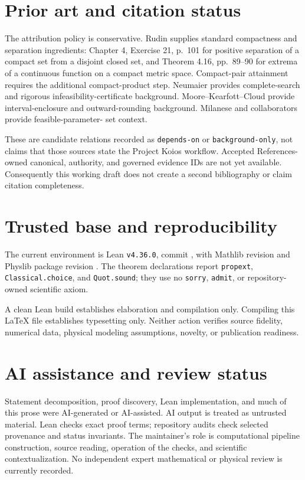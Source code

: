 \documentclass[11pt]{article}
\begin{document}
\section{Prior art and citation status}

The attribution policy is conservative. Rudin supplies standard compactness and
separation ingredients: Chapter 4, Exercise 21, p.~101 for positive separation of a
compact set from a disjoint closed set, and Theorem 4.16, pp.~89--90 for extrema of a
continuous function on a compact metric space. Compact-pair attainment requires the
additional compact-product step. Neumaier provides complete-search and rigorous
infeasibility-certificate background. Moore--Kearfott--Cloud provide interval-enclosure
and outward-rounding background. Milanese and collaborators provide feasible-parameter-
set context.

These are candidate relations recorded as \texttt{depends-on} or
\texttt{background-only}, not claims that those sources state the Project Koios workflow.
Accepted References-owned canonical, authority, and governed evidence IDs are not yet
available. Consequently this working draft does not create a second bibliography or
claim citation completeness.

\section{Trusted base and reproducibility}

The current environment is Lean \texttt{v4.36.0}, commit
, with Mathlib revision
 and Physlib package revision
. The theorem declarations report
\texttt{propext}, \texttt{Classical.choice}, and \texttt{Quot.sound}; they use no
\texttt{sorry}, \texttt{admit}, or repository-owned scientific axiom.

A clean Lean build establishes elaboration and compilation only. Compiling this LaTeX
file establishes typesetting only. Neither action verifies source fidelity, numerical
data, physical modeling assumptions, novelty, or publication readiness.

\section{AI assistance and review status}

Statement decomposition, proof discovery, Lean implementation, and much of this prose
were AI-generated or AI-assisted. AI output is treated as untrusted material. Lean checks
exact proof terms; repository audits check selected provenance and status invariants. The
maintainer's role is computational pipeline construction, source reading, operation of
the checks, and scientific contextualization. No independent expert mathematical or
physical review is currently recorded.
\end{document}
